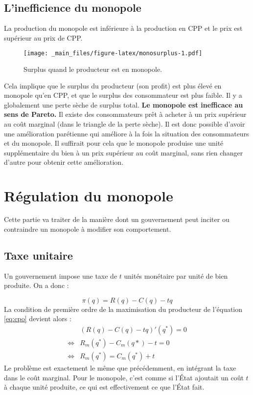\documentclass[
  a4paper,
]{book}
\theoremstyle{definition}
\theoremstyle{definition}
\theoremstyle{definition}
\theoremstyle{definition}
\theoremstyle{remark}
\begin{document}
\hypertarget{linefficience-du-monopole}{%
\subsection{L'inefficience du monopole}\label{linefficience-du-monopole}}

La production du monopole est inférieure à la production en CPP et le prix est supérieur au prix de CPP.

\begin{figure}
\centering
\texttt{[image: \_main\_files/figure-latex/monosurplus-1.pdf]}
\caption{\label{fig:monosurplus}Surplus quand le producteur est en monopole.}
\end{figure}

Cela implique que le surplus du producteur (son profit) est plus élevé en monopole qu'en CPP, et que le surplus des consommateur est plus faible.
Il y a globalement une perte sèche de surplus total.
\textbf{Le monopole est inefficace au sens de Pareto.}
Il existe des consommateurs prêt à acheter à un prix supérieur au coût marginal (dans le triangle de la perte sèche).
Il est donc possible d'avoir une amélioration parétienne qui améliore à la fois la situation des consommateurs et du monopole.
Il suffirait pour cela que le monopole produise une unité supplémentaire du bien à un prix supérieur au coût marginal, sans rien changer d'autre pour obtenir cette amélioration.

\hypertarget{ruxe9gulation-du-monopole}{%
\section{Régulation du monopole}\label{ruxe9gulation-du-monopole}}

Cette partie va traiter de la manière dont un gouvernement peut inciter ou contraindre un monopole à modifier son comportement.

\hypertarget{taxe-unitaire}{%
\subsection{Taxe unitaire}\label{taxe-unitaire}}

Un gouvernement impose une taxe de \(t\) unités monétaire par unité de bien produite.
On a donc :

\[
\pi(q) = R(q) - C(q) -tq
\]
La condition de première ordre de la maximisation du producteur de l'équation \eqref{eq:cpo} devient alors :
\[
\begin{array}{rl}
&(R(q)-C(q) -tq)'(q^*) = 0\\
\Leftrightarrow & R_m(q^*)-C_m(q*) -t = 0\\
\Leftrightarrow & R_m(q^*) = C_m(q^*) + t
\end{array}
\]
Le problème est exactement le même que précédemment, en intégrant la taxe dans le coût marginal.
Pour le monopole, c'est comme si l'État ajoutait un coût \(t\) à chaque unité produite, ce qui est effectivement ce que l'État fait.
\end{document}
